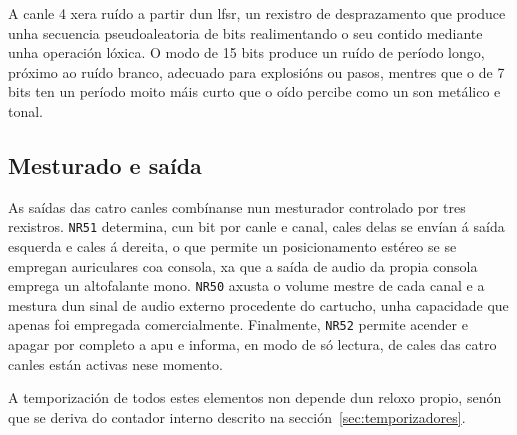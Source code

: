 A canle 4 xera ruído a partir dun \acrfull{lfsr}, un rexistro de desprazamento que produce
unha secuencia pseudoaleatoria de bits realimentando o seu contido mediante unha operación
lóxica. O modo de 15 bits produce un ruído de período longo, próximo ao ruído branco,
adecuado para explosións ou pasos, mentres que o de 7 bits ten un período moito máis curto
que o oído percibe como un son metálico e tonal.

\subsection{Mesturado e saída}

As saídas das catro canles combínanse nun mesturador controlado por tres rexistros.
\texttt{NR51} determina, cun bit por canle e canal, cales delas se envían á saída esquerda
e cales á dereita, o que permite un posicionamento estéreo se se empregan auriculares coa consola,
xa que a saída de audio da propia consola emprega un altofalante mono.
\texttt{NR50} axusta o volume mestre de cada canal e a mestura dun sinal de audio externo
procedente do cartucho, unha capacidade que apenas foi empregada comercialmente.
Finalmente, \texttt{NR52} permite acender e apagar por completo a \acrshort{apu} e informa,
en modo de só lectura, de cales das catro canles están activas nese momento.

A temporización de todos estes elementos non depende dun reloxo propio, senón que se deriva
do contador interno descrito na sección~\ref{sec:temporizadores}.
